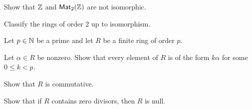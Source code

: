 \begin{exercise}
Show that \(\mathbb{Z}\) and \(\mathsf{Mat}_{2}(\mathbb{Z})\) are not isomorphic.
\end{exercise}


\begin{exercise}
Classify the rings of order 2 up to isomorphism.
\end{exercise}


\begin{exercise}
Let \(p \in \mathbb{N}\) be a prime and let \(R\) be a finite ring of order \(p\).
\begin{proplist}
\item Let \(\alpha \in R\) be nonzero.
Show that every element of \(R\) is of the form \(k\alpha\) for some \(0 \leq k < p\).
\item Show that \(R\) is commutative.
\item Show that if \(R\) contains zero divisors, then \(R\) is null.
\end{proplist}
\end{exercise}
